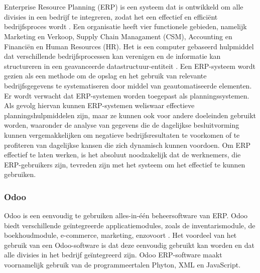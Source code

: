 \chapter{}%
\label{ch:stand-van-zaken}



\section{}%
\label{sec:erp}
Enterprise Resource Planning (ERP) is een systeem dat is ontwikkeld om alle divisies in een bedrijf te integreren, zodat het een effectief en efficiënt bedrijfsproces wordt \autocite{Wardhanaa2022}. Een organisatie heeft vier functionele gebieden, namelijk Marketing en Verkoop, Supply Chain Managament (CSM), Accounting en Financiën en Human Resources (HR).
Het is een computer gebaseerd hulpmiddel dat verschillende bedrijfsprocessen kan verenigen en de informatie kan structureren in een geavanceerde datastructuur-entiteit \autocite{Xulu2020}. Een ERP-systeem wordt gezien als een methode om de opslag en het gebruik van relevante bedrijfsgegevens te systematiseren door middel van geautomatiseerde elementen. Er wordt verwacht dat ERP-systemen worden toegepast als planningssystemen. Als gevolg hiervan kunnen ERP-systemen weliswaar effectieve  planningshulpmiddelen zijn, maar ze kunnen ook voor andere doeleinden gebruikt worden, waaronder de analyse van gegevens die de dagelijkse besluitvorming kunnen vergemakkelijken om negatieve bedrijfsresultaten te voorkomen of te profiteren van dagelijkse kansen die zich dynamisch kunnen voordoen.
Om ERP effectief te laten werken, is het absoluut noodzakelijk dat de werknemers, die ERP-gebruikers zijn, tevreden zijn met het systeem om het effectief te kunnen gebruiken.

\subsection{Odoo}
Odoo is een eenvoudig te gebruiken alles-in-één beheersoftware van ERP. Odoo biedt verschillende geïntegreerde applicatiemodules, zoals de inventarismodule, de boekhoudmodule, e-commerce, marketing, enzovoort \autocite{Wardhanaa2022}. Het voordeel van het gebruik van een Odoo-software is dat deze eenvoudig gebruikt kan worden en dat alle divisies in het bedrijf geïntegreerd zijn. Odoo ERP-software maakt voornamelijk gebruik van de programmeertalen Phyton, XML en JavaScript.

